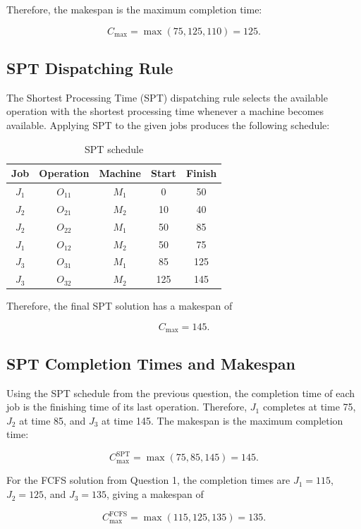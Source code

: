 \documentclass[a4paper,12pt]{article}
\begin{document}
Therefore, the makespan is the maximum completion time:

$$
C_{\max} = \max(75,125,110) = 125.
$$
\subsection{SPT Dispatching Rule}

The Shortest Processing Time (SPT) dispatching rule selects the available operation with the shortest processing time whenever a machine becomes available. Applying SPT to the given jobs produces the following schedule:

\begin{table}[ht]
	\centering
	\caption{SPT schedule}
	\label{tab:spt-schedule}
	\begin{tabular}{c c c c c}
		\hline
		\textbf{Job} & \textbf{Operation} & \textbf{Machine} & \textbf{Start} & \textbf{Finish} \\
		\hline
		$J_1$ & $O_{11}$ & $M_1$ & 0   & 50 \\
		$J_2$ & $O_{21}$ & $M_2$ & 10  & 40 \\
		$J_2$ & $O_{22}$ & $M_1$ & 50  & 85 \\
		$J_1$ & $O_{12}$ & $M_2$ & 50  & 75 \\
		$J_3$ & $O_{31}$ & $M_1$ & 85  & 125 \\
		$J_3$ & $O_{32}$ & $M_2$ & 125 & 145 \\
		\hline
	\end{tabular}
\end{table}

Therefore, the final SPT solution has a makespan of

$$
C_{\max}=145.
$$

\subsection{SPT Completion Times and Makespan}

Using the SPT schedule from the previous question, the completion time of each job is the finishing time of its last operation. Therefore, $J_1$ completes at time 75, $J_2$ at time 85, and $J_3$ at time 145. The makespan is the maximum completion time:

$$
C_{\max}^{\mathrm{SPT}} = \max(75,85,145)=145.
$$

For the FCFS solution from Question 1, the completion times are $J_1=115$, $J_2=125$, and $J_3=135$, giving a makespan of

$$
C_{\max}^{\mathrm{FCFS}} = \max(115,125,135)=135.
$$
\end{document}
